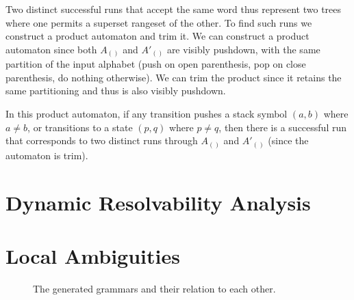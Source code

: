 \documentclass[acmsmall,review,anonymous]{acmart}\settopmatter{printfolios=true,printccs=false,printacmref=false}
\newcommand{\yield}{\mathit{yield}} %
\newcommand{\semantic}{\mathit{unparen}} %
\begin{document}
\noindent Two distinct successful runs that accept the same word thus represent two trees where one permits a superset rangeset of the other. To find such runs we construct a product automaton and trim it. We can construct a product automaton since both $A_{()}$ and $A'_{()}$ are visibly pushdown, with the same partition of the input alphabet (push on open parenthesis, pop on close parenthesis, do nothing otherwise). We can trim the product since it retains the same partitioning and thus is also visibly pushdown.

In this product automaton, if any transition pushes a stack symbol $(a, b)$ where $a \neq b$, or transitions to a state $(p, q)$ where $p \neq q$, then there is a successful run that corresponds to two distinct runs through $A_{()}$ and $A'_{()}$ (since the automaton is trim).

\section{Dynamic Resolvability Analysis} \label{sec:dynamic}

\section{Local Ambiguities} \label{sec:local}

\newpage

\begin{figure*}[ht]
  \caption{The generated grammars and their relation to each other.}
\end{figure*}
\end{document}
